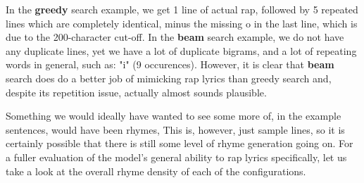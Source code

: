 In the \textbf{greedy} search example, we get 1 line of actual rap, followed by 5 repeated lines which are completely identical, minus the missing o in the last line, which is due to the 200-character cut-off. In the \textbf{beam} search example, we do not have any duplicate lines, yet we have a lot of duplicate bigrams, and a lot of repeating words in general, such as: "i" (9 occurences). However, it is clear that \textbf{beam} search does do a better job of mimicking rap lyrics than greedy search and, despite its repetition issue, actually almost sounds plausible.

Something we would ideally have wanted to see some more of, in the example sentences, would have been rhymes, This is, however, just sample lines, so it is certainly possible that there is still some level of rhyme generation going on. For a fuller evaluation of the model’s general ability to rap lyrics specifically, let us take a look at the overall rhyme density of each of the configurations.

\begin{table}[H]
    \begin{center}
    \caption{Decoding Configurations - Rhyme Densities}
    \vspace{6pt}
    \label{tab:decoding-configs-rd}
    \bgroup
    \def\arraystretch{1.3}
    \egroup
    \end{center}
\end{table}

